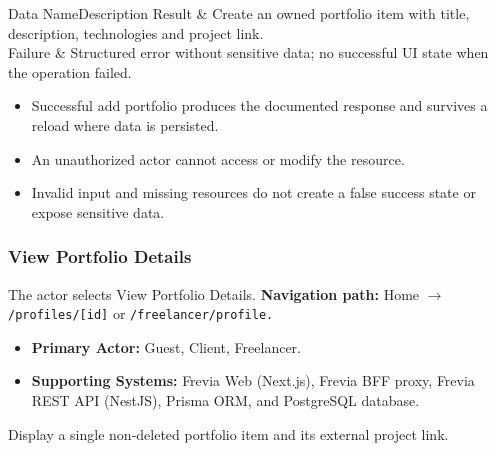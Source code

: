 \begin{specdatatable}{Data Name}{Description}
Result & Create an owned portfolio item with title, description, technologies and project link.\\ \hline
Failure & Structured error without sensitive data; no successful UI state when the operation failed.\\ \hline
\end{specdatatable}

\begin{itemize}[leftmargin=1.6em,topsep=3pt,itemsep=2pt,parsep=0pt,label=$\bullet$]
    \item Successful add portfolio produces the documented response and survives a reload where data is persisted.
    \item An unauthorized actor cannot access or modify the resource.
    \item Invalid input and missing resources do not create a false success state or expose sensitive data.
\end{itemize}

\subsubsection{View Portfolio Details}

The actor selects View Portfolio Details.\newline
\textbf{Navigation path:} Home $\rightarrow$ \texttt{/\allowbreak{}profiles/\allowbreak{}[id]} or \texttt{/\allowbreak{}freelancer/\allowbreak{}profile.}


\begin{itemize}[leftmargin=1.6em,topsep=3pt,itemsep=2pt,parsep=0pt,label=$\bullet$]
    \item \textbf{Primary Actor:} Guest, Client, Freelancer.
    \item \textbf{Supporting Systems:} Frevia Web (Next.js), Frevia BFF proxy, Frevia REST API (NestJS), Prisma ORM, and PostgreSQL database.
\end{itemize}

\noindent Display a single non-deleted portfolio item and its external project link.

